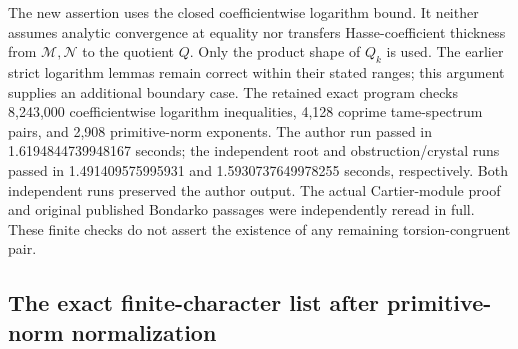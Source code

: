 \begin{remark}
\label{rem:B-RD50-scope}
The new assertion uses the closed coefficientwise logarithm
bound. It neither assumes analytic convergence at equality nor
transfers Hasse-coefficient thickness from $\mathcal M,\mathcal N$
to the quotient $Q$. Only the product shape of $Q_k$ is used.
The earlier strict logarithm lemmas remain correct within their
stated ranges; this argument supplies an additional boundary case.
The retained exact program
checks 8,243,000 coefficientwise logarithm inequalities, 4,128
coprime tame-spectrum pairs, and 2,908 primitive-norm exponents.
The author run passed in 1.6194844739948167 seconds; the
independent root and obstruction/crystal runs passed in
1.491409575995931 and 1.5930737649978255 seconds, respectively.
Both independent runs preserved the author output. The actual
Cartier-module proof and original published Bondarko passages
were independently reread in full. These finite checks do not
assert the existence of any remaining torsion-congruent pair.
\end{remark}


\subsection{The exact finite-character list after primitive-norm normalization}

